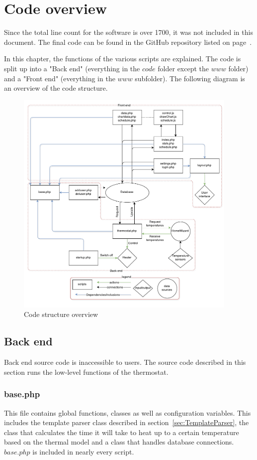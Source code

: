 \documentclass[12pt,a4paper,final]{report}
\begin{document}
\chapter{Code overview} \label{chap:codeOverview}
Since the total line count for the software is over 1700, it was not included in this document. The final code can be found in the GitHub repository listed on page~\pageref{chap:Software}. 

In this chapter, the functions of the various scripts are explained. The code is split up into a "Back end" (everything in the $code$ folder except the $www$ folder) and a "Front end" (everything in the $www$ subfolder). The following diagram is an overview of the code structure.
\begin{figure}[H]
  \begin{center}
      \includegraphics[width=0.95\textwidth]{Overview}
  \end{center}
  \caption{Code structure overview}
\end{figure}
\section{Back end}
Back end source code is inaccessible to users. The source code described in this section runs the low-level functions of the thermostat.
\subsection*{base.php}
This file contains global functions, classes as well as configuration variables. This includes the template parser class described in section~\ref{sec:TemplateParser}, the class that calculates the time it will take to heat up to a certain temperature based on the thermal model and a class that handles database connections. $base.php$ is included in nearly every script.
\end{document}
